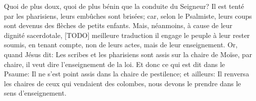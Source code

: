 Quoi de plus doux, quoi de plus bénin que la conduite du Seigneur?
	Il est tenté par les pharisiens, leurs embûches sont brisées;
	car, selon le Psalmiste,
		leurs coups sont devenus des flèches de petits enfants.
Mais, néanmoins, à cause de leur dignité sacerdotale, [TODO] meilleure traduction
	il engage le peuple à leur rester soumis,
	en tenant compte, non de leurs actes, mais de leur enseignement.
Or, quand Jésus dit:
	Les scribes et les pharisiens sont assis sur la chaire de Moïse,
	par chaire, il veut dire l’enseignement de la loi.
Et donc ce qui est dit dans le Psaume:
	Il ne s’est point assis dans la chaire de pestilence;
	et ailleurs: Il renversa les chaires de ceux qui vendaient des colombes,
	nous devons le prendre dans le sens d’enseignement.
